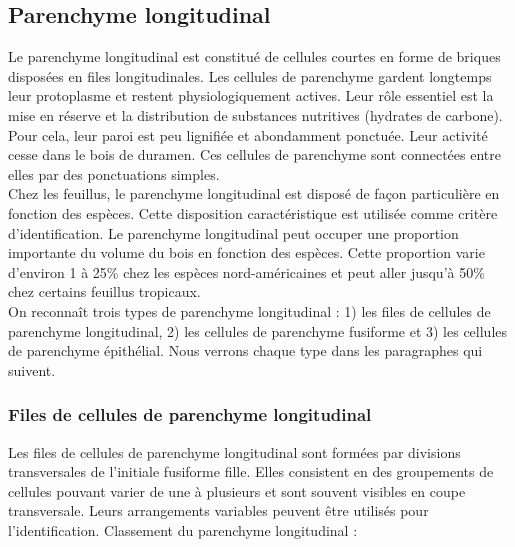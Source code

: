 \subsection{Parenchyme longitudinal}

Le parenchyme longitudinal est constitué de cellules courtes en forme de briques disposées en files longitudinales. Les cellules de parenchyme gardent longtemps leur protoplasme et restent physiologiquement actives. Leur rôle essentiel est la mise en réserve et la distribution de substances nutritives (hydrates de carbone). Pour cela, leur paroi est peu lignifiée et abondamment ponctuée. Leur activité cesse dans le bois de duramen. Ces cellules de parenchyme sont connectées entre elles par des ponctuations simples.\\

Chez les feuillus, le parenchyme longitudinal est disposé de façon particulière en fonction des espèces. Cette disposition caractéristique est utilisée comme critère d'identification. Le parenchyme longitudinal peut occuper une proportion importante du volume du bois en fonction des espèces. Cette proportion varie d'environ 1 à 25\% chez les espèces nord-américaines et peut aller jusqu'à 50\% chez certains feuillus tropicaux.\\

On reconnaît trois types de parenchyme longitudinal : 1) les files de cellules de parenchyme longitudinal, 2) les cellules de parenchyme fusiforme et 3) les cellules de parenchyme épithélial. Nous verrons chaque type dans les paragraphes qui suivent.

\subsubsection{Files de cellules de parenchyme longitudinal}

Les files de cellules de parenchyme longitudinal sont formées par divisions transversales de l'initiale fusiforme fille.  Elles consistent en des groupements de cellules pouvant varier de une à plusieurs et sont souvent visibles en coupe transversale. Leurs arrangements variables peuvent être utilisés pour l'identification. Classement du parenchyme longitudinal :

